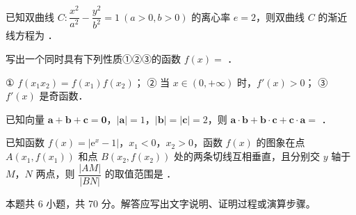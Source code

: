 \begin{question}
已知双曲线 $C:\dfrac{x^{2}}{a^{2}}-\dfrac{y^{2}}{b^{2}}=1\ (a>0,b>0)$ 的离心率 $e=2$，则双曲线 $C$ 的渐近线方程为 \gkblank{}．

\end{question}
\begin{question}
写出一个同时具有下列性质①②③的函数 $f(x)=$ \gkblank{}．

  ① $f\left(x_1x_2\right)=f\left(x_1\right)f\left(x_2\right)$；
  ② 当 $x\in(0,+\infty)$ 时，$f'(x)>0$；
  ③ $f'(x)$ 是奇函数．

\end{question}
\begin{question}
已知向量 $\boldsymbol a+\boldsymbol b+\boldsymbol c=\boldsymbol 0$，$|\boldsymbol a|=1$，$|\boldsymbol b|=|\boldsymbol c|=2$，则 $\boldsymbol a\cdot\boldsymbol b+\boldsymbol b\cdot\boldsymbol c+\boldsymbol c\cdot\boldsymbol a=$ \gkblank{}．

\end{question}
\begin{question}
已知函数 $f(x)=\left|\mathrm e^{x}-1\right|$，$x_1<0$，$x_2>0$，函数 $f(x)$ 的图象在点 $A\left(x_1,f\left(x_1\right)\right)$ 和点 $B\left(x_2,f\left(x_2\right)\right)$ 处的两条切线互相垂直，且分别交 $y$ 轴于 $M$，$N$ 两点，则 $\dfrac{|AM|}{|BN|}$ 的取值范围是 \gkblank{}．

\par\medskip

\end{question}

\begin{gktip}
本题共 6 小题，共 70 分。解答应写出文字说明、证明过程或演算步骤。
\end{gktip}

